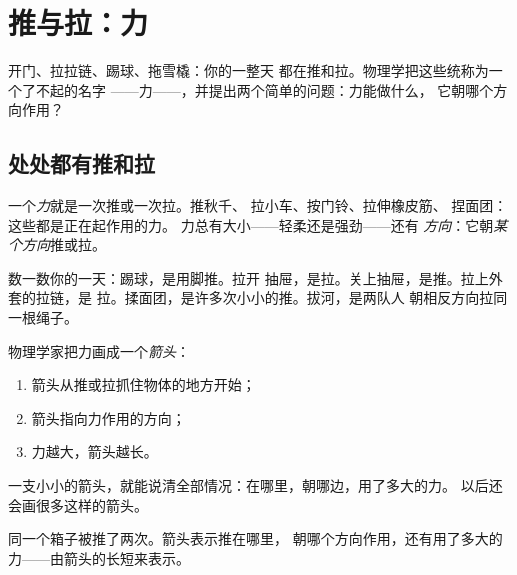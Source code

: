 \chapter{推与拉：力}\label{ch:g2:pushes-and-pulls}

开门、拉拉链、踢球、拖雪橇：你的一整天
都在推和拉。物理学把这些统称为一个了不起的名字
——力——，并提出两个简单的问题：力能做什么，
它朝哪个方向作用？

\section{处处都有推和拉}

\begin{definition}[力]\label{def:g2:pushes-and-pulls:force}
一个\emph{力}就是一次推或一次拉。推秋千、
拉小车、按门铃、拉伸橡皮筋、
捏面团：这些都是正在起作用的力。
力总有大小——轻柔还是强劲——还有
\emph{方向}：它朝\emph{某个方向}推或拉。
\end{definition}

\begin{example}[推还是拉？]\label{ex:g2:pushes-and-pulls:sort}
数一数你的一天：踢球，是用脚推。拉开
抽屉，是拉。关上抽屉，是推。拉上外套的拉链，是
拉。揉面团，是许多次小小的推。拔河，是两队人
朝相反方向拉同一根绳子。
\end{example}

\begin{method}[用箭头画力]\label{met:g2:pushes-and-pulls:arrow}
物理学家把力画成一个\emph{箭头}：
\begin{enumerate}
  \item 箭头从推或拉抓住物体的地方开始；
  \item 箭头指向力作用的方向；
  \item 力越大，箭头越长。
\end{enumerate}
一支小小的箭头，就能说清全部情况：在哪里，朝哪边，用了多大的力。
以后还会画很多这样的箭头。
\end{method}

\begin{omfigure}

{\small 同一个箱子被推了两次。箭头表示推在哪里，
朝哪个方向作用，还有用了多大的力——由箭头的长短来表示。}
\end{omfigure}

